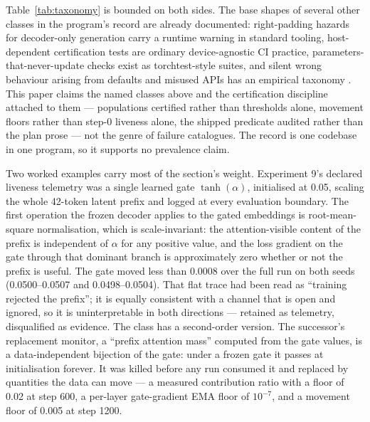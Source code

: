 \documentclass[10pt,a4paper]{article}
\begin{document}
\begin{table}[htbp]
\begin{tabularx}{\textwidth}{@{}>{\raggedright\arraybackslash}p{1.7cm}>{\raggedright\arraybackslash}X>{\raggedright\arraybackslash}X>{\raggedright\arraybackslash}X@{}}
\bottomrule
\end{tabularx}
\end{table}

Table~\ref{tab:taxonomy} is bounded on both sides. The base shapes of several other classes in the program's record are already documented: right-padding hazards for decoder-only generation carry a runtime warning in standard tooling, host-dependent certification tests are ordinary device-agnostic CI practice, parameters-that-never-update checks exist as torchtest-style suites, and silent wrong behaviour arising from defaults and misused APIs has an empirical taxonomy \cite{tambon2021}. This paper claims the named classes above and the certification discipline attached to them --- populations certified rather than thresholds alone, movement floors rather than step-0 liveness alone, the shipped predicate audited rather than the plan prose --- not the genre of failure catalogues. The record is one codebase in one program, so it supports no prevalence claim.

Two worked examples carry most of the section's weight. Experiment 9's declared liveness telemetry was a single learned gate $\tanh(\alpha)$, initialised at 0.05, scaling the whole 42-token latent prefix and logged at every evaluation boundary. The first operation the frozen decoder applies to the gated embeddings is root-mean-square normalisation, which is scale-invariant: the attention-visible content of the prefix is independent of $\alpha$ for any positive value, and the loss gradient on the gate through that dominant branch is approximately zero whether or not the prefix is useful. The gate moved less than 0.0008 over the full run on both seeds (0.0500--0.0507 and 0.0498--0.0504). That flat trace had been read as ``training rejected the prefix''; it is equally consistent with a channel that is open and ignored, so it is uninterpretable in both directions --- retained as telemetry, disqualified as evidence. The class has a second-order version. The successor's replacement monitor, a ``prefix attention mass'' computed from the gate values, is a data-independent bijection of the gate: under a frozen gate it passes at initialisation forever. It was killed before any run consumed it and replaced by quantities the data can move --- a measured contribution ratio with a floor of 0.02 at step 600, a per-layer gate-gradient EMA floor of $10^{-7}$, and a movement floor of 0.005 at step 1200.
\end{document}
